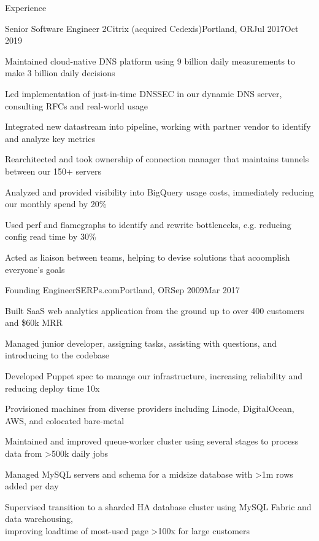 \documentclass[letterpaper,12pt]{article}
\begin{document}
\begin{paracol}{2}
\begin{res_section}{Experience}
  \begin{res_experienceitem}{Senior Software Engineer 2}{Citrix (acquired Cedexis)}{Portland, OR}{Jul 2017}{Oct 2019}
  \item Maintained cloud-native DNS platform using 9 billion daily measurements to make 3 billion daily decisions
  \item Led implementation of just-in-time DNSSEC in our dynamic DNS server, consulting RFCs and real-world usage
  \item Integrated new datastream into pipeline, working with partner vendor to identify and analyze key metrics
  \item Rearchitected and took ownership of connection manager that maintains tunnels between our 150+ servers
  \item Analyzed and provided visibility into BigQuery usage costs, immediately reducing our monthly spend by 20\%
  \item Used perf and flamegraphs to identify and rewrite bottlenecks, e.g. reducing config read time by 30\%
  \item Acted as liaison between teams, helping to devise solutions that acoomplish everyone's goals
\end{res_experienceitem}
\begin{res_experienceitem}{Founding Engineer}{SERPs.com}{Portland, OR}{Sep 2009}{Mar 2017}
  \item Built SaaS web analytics application from the ground up to over 400 customers and \$60k MRR
  \item Managed junior developer, assigning tasks, assisting with questions, and introducing to the codebase
  \item Developed Puppet spec to manage our infrastructure, increasing reliability and reducing deploy time 10x
  \item Provisioned machines from diverse providers including Linode, DigitalOcean, AWS, and colocated bare-metal
  \item Maintained and improved queue-worker cluster using several stages to process data from \textgreater500k daily jobs
  \item Managed MySQL servers and schema for a midsize database with \textgreater1m rows added per day
  \item Supervised transition to a sharded HA database cluster using MySQL Fabric and data warehousing,\\
        improving loadtime of most-used page \textgreater100x for large customers

\end{res_experienceitem}
\end{res_section}
\end{paracol}
\end{document}
